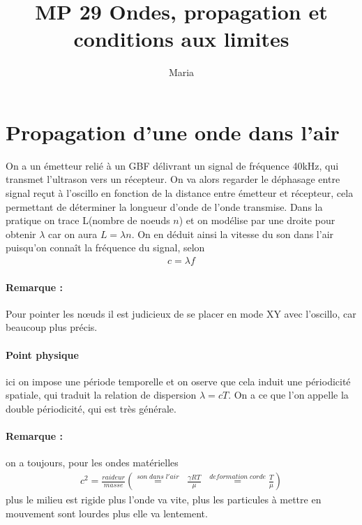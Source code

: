 \documentclass[12pt,prb,aps,epsf]{article}
\begin{document}
	
	\title{MP 29 Ondes, propagation et conditions aux limites}
	\author{Maria}
	
	\maketitle
	
	\tableofcontents
	
	\pagebreak
	
\section{Propagation d'une onde dans l'air}
On a un émetteur relié à un GBF délivrant un signal de fréquence 40kHz, qui transmet l'ultrason vers un récepteur. On va alors regarder le déphasage entre signal reçut à l'oscillo en fonction de la distance entre émetteur et récepteur, cela permettant de déterminer la longueur d'onde de l'onde transmise. Dans la pratique on trace L(nombre de noeuds $n$) et on modélise par une droite pour obtenir $\lambda$ car on aura $L=\lambda n$. On en déduit ainsi la vitesse du son dans l'air puisqu'on connaît la fréquence du signal, selon
\begin{eqnarray}
c=\lambda f
\end{eqnarray}
\paragraph{Remarque :} Pour pointer les nœuds il est judicieux de se placer en mode XY avec l'oscillo, car beaucoup plus précis.
\paragraph{Point physique} ici on impose une période temporelle et on oserve que cela induit une périodicité spatiale, qui traduit la relation de dispersion $\lambda =cT$. On a ce que l'on appelle la double périodicité, qui est très générale.

\paragraph{Remarque :} on a toujours, pour les ondes matérielles 
\begin{eqnarray}
c^2 = \frac{raideur}{masse} \left(\stackrel{son\;dans\;l'air}{=} \;\;\frac{\gamma R T}{\mu}\;\; \stackrel{deformation\;corde}{=} \frac{T}{\mu} \right)
\end{eqnarray}
plus le milieu est rigide plus l'onde va vite, plus les particules à mettre en mouvement sont lourdes plus elle va lentement.
\end{document}
